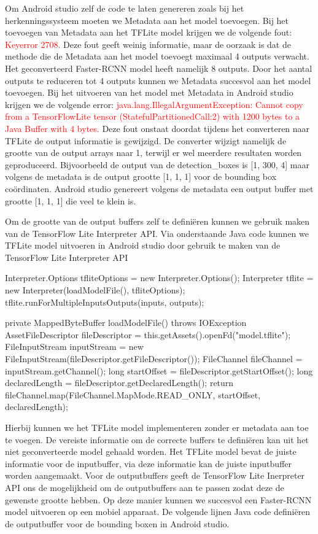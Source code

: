 Om Android studio zelf de code te laten genereren zoals bij het herkenningssysteem moeten we Metadata aan het model toevoegen. 
Bij het toevoegen van Metadata aan het TFLite model krijgen we de volgende fout: \textcolor{red}{Keyerror 2708.}
Deze fout geeft weinig informatie, maar de oorzaak is dat de methode die de Metadata aan het model toevoegt maximaal 4 outputs verwacht.
Het geconverteerd Faster-RCNN model heeft namelijk 8 outputs.
Door het aantal outputs te reduceren tot 4 outputs kunnen we Metadata succesvol aan het model toevoegen. %
Bij het uitvoeren van het model met Metadata in Android studio krijgen we de volgende error: 
\textcolor{red}{java.lang.IllegalArgumentException: Cannot copy from a TensorFlowLite tensor (StatefulPartitionedCall:2) with 1200 bytes to a Java Buffer with 4 bytes.}
\newline
Deze fout onstaat doordat tijdens het converteren naar TFLite de output informatie is gewijzigd.
De converter wijzigt namelijk de grootte van de output arrays naar 1, terwijl er wel meerdere resultaten worden geproduceerd.
Bijvoorbeeld de output van de detection\_boxes is [1, 300, 4] maar volgens de metadata is de output grootte [1, 1, 1] voor de bounding box co\"ordinaten.
Android studio genereert volgens de metadata een output buffer met grootte [1, 1, 1] die veel te klein is.

Om de grootte van de output buffers zelf te defini\"eren kunnen we gebruik maken van de TensorFlow Lite Interpreter API.
Via onderstaande Java code kunnen we TFLite model uitvoeren in Android studio door gebruik te maken van de TensorFlow Lite Interpreter API

\begin{python}
Interpreter.Options tfliteOptions = new Interpreter.Options();
Interpreter tflite = new Interpreter(loadModelFile(), tfliteOptions);
tflite.runForMultipleInputsOutputs(inputs, outputs);

private MappedByteBuffer loadModelFile() throws IOException {
    AssetFileDescriptor fileDescriptor = this.getAssets().openFd("model.tflite");
    FileInputStream inputStream = new FileInputStream(fileDescriptor.getFileDescriptor());
    FileChannel fileChannel = inputStream.getChannel();
    long startOffset = fileDescriptor.getStartOffset();
    long declaredLength = fileDescriptor.getDeclaredLength();
    return fileChannel.map(FileChannel.MapMode.READ_ONLY, startOffset, declaredLength);
}
\end{python}

Hierbij kunnen we het TFLite model implementeren zonder er metadata aan toe te voegen.
De vereiste informatie om de correcte buffers te defini\"eren kan uit het niet geconverteerde model gehaald worden.
Het TFLite model bevat de juiste informatie voor de inputbuffer, via deze informatie kan de juiste inputbuffer worden aangemaakt.
Voor de outputbuffers geeft de TensorFlow Lite Inerpreter API ons de mogelijkheid om de outputbuffers aan te passen zodat deze de gewenste grootte hebben.
Op deze manier kunnen we succesvol een Faster-RCNN model uitvoeren op een mobiel apparaat.
De volgende lijnen Java code defini\"eren de outputbuffer voor de bounding boxen in Android studio.

